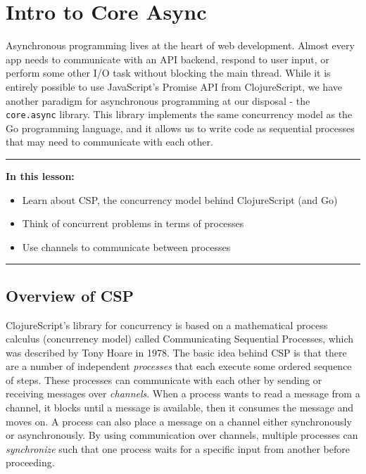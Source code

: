 \documentclass[10pt,twoside,openright]{memoir}
\begin{document}
\chapter{Intro to Core Async}

Asynchronous programming lives at the heart of web development. Almost
every app needs to communicate with an API backend, respond to user
input, or perform some other I/O task without blocking the main thread.
While it is entirely possible to use JavaScript's Promise API from
ClojureScript, we have another paradigm for asynchronous programming at
our disposal - the \texttt{core.async} library. This library implements
the same concurrency model as the Go programming language, and it allows
us to write code as sequential processes that may need to communicate
with each other.

\begin{center}\rule{0.5\linewidth}{0.5pt}\end{center}

\textbf{In this lesson:}

\begin{itemize}
\tightlist
\item
  Learn about CSP, the concurrency model behind ClojureScript (and Go)
\item
  Think of concurrent problems in terms of processes
\item
  Use channels to communicate between processes
\end{itemize}

\begin{center}\rule{0.5\linewidth}{0.5pt}\end{center}


\section{Overview of CSP}

ClojureScript's library for concurrency is based on a mathematical
process calculus (concurrency model) called Communicating Sequential
Processes, which was described by Tony Hoare in 1978. The basic idea
behind CSP is that there are a number of independent \emph{processes}
that each execute some ordered sequence of steps. These processes can
communicate with each other by sending or receiving messages over
\emph{channels}. When a process wants to read a message from a channel,
it blocks until a message is available, then it consumes the message and
moves on. A process can also place a message on a channel either
synchronously or asynchronously. By using communication over channels,
multiple processes can \emph{synchronize} such that one process waits
for a specific input from another before proceeding.
\end{document}
